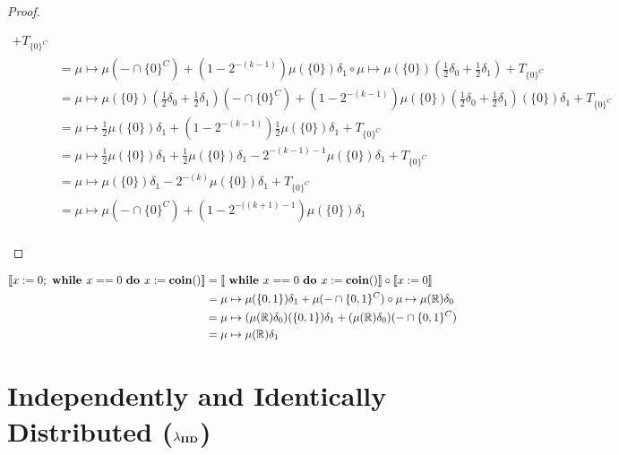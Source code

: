 \documentclass{article}
\begin{document}
\begin{proof}
\begin{itemize}
\begin{equation*}
\begin{split}
							+ T_{\{0\}^C} \\
							&= \mu \mapsto \mu(- \cap \{0\}^C) + (1 - 2^{-(k-1)})\mu(\{0\})\delta_1 
							\circ \mu \mapsto \mu(\{0\})\left(\frac{1}{2}\delta_0 + \frac{1}{2}\delta_1\right)
							+ T_{\{0\}^C} \\
							&= \mu \mapsto \mu(\{0\})\left(\frac{1}{2}\delta_0 + \frac{1}{2}\delta_1\right)(- \cap \{0\}^C) + (1 - 2^{-(k-1)})\mu(\{0\})\left(\frac{1}{2}\delta_0 + \frac{1}{2}\delta_1\right)(\{0\})\delta_1
							+ T_{\{0\}^C} \\
							&= \mu \mapsto \frac{1}{2}\mu(\{0\})\delta_1 + (1 - 2^{-(k-1)})\frac{1}{2}\mu(\{0\})\delta_1
							+ T_{\{0\}^C} \\
							&= \mu \mapsto \frac{1}{2}\mu(\{0\})\delta_1 + \frac{1}{2}\mu(\{0\})\delta_1 -  2^{-(k-1)-1}\mu(\{0\})\delta_1
							+ T_{\{0\}^C} \\
							&= \mu \mapsto \mu(\{0\})\delta_1 -  2^{-(k)}\mu(\{0\})\delta_1
							+ T_{\{0\}^C} \\
							&= \mu \mapsto \mu(- \cap \{0\}^C) + (1-2^{-((k+1) - 1})\mu(\{0\})\delta_1\\
						\end{split}
					\end{equation*}
			\end{itemize}
		\end{proof}
		
		\begin{equation*}
			\begin{split}
				[\![ x := 0; \text{ \bf while } x == 0 \text{ \bf do } x := { \bf coin()} ]\!]
				&= [\![\text{ \bf while } x == 0 \text{ \bf do } x := { \bf coin()} ]\!] \circ [\![ x := 0]\!] \\
				&= \mu \mapsto \mu(\{0, 1\})\delta_1 + \mu(- \cap \{0, 1\}^C) \circ \mu \mapsto \mu(\mathbb{R})\delta_0 \\
				&= \mu \mapsto (\mu(\mathbb{R})\delta_0)(\{0, 1\})\delta_1 + (\mu(\mathbb{R})\delta_0)(- \cap \{0, 1\}^C) \\
				&= \mu \mapsto \mu(\mathbb{R})\delta_1 \\
			\end{split}
		\end{equation*}

\newpage
	\section{Independently and Identically Distributed ($\lambda_{\bf IID}$)}
\end{document}
